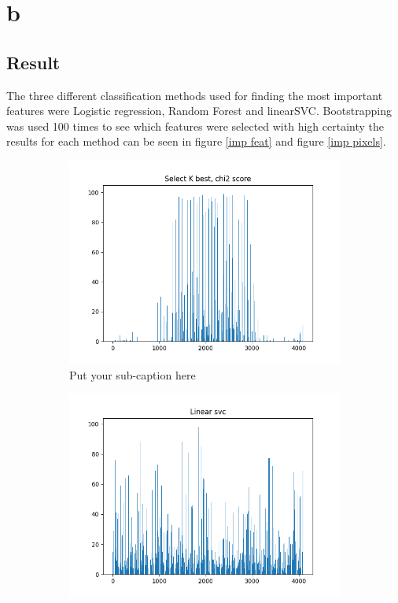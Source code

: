 \documentclass{article}
\begin{document}
\section{b}
\subsection{Result}
The three different classification methods used for finding the most important features were Logistic regression, Random Forest and linearSVC. Bootstrapping was used 100 times to see which features were selected with high certainty the results for each method can be seen in figure \ref{imp feat} and figure \ref{imp pixels}. 
\begin{figure}[ht]
\begin{subfigure}{.33\textwidth}
  \centering
  \includegraphics[width=1\linewidth]{1b/Figure_2.png}  
  \caption{Put your sub-caption here}
  \label{fig:sub-first}
\end{subfigure}
\begin{subfigure}{.33\textwidth}
  \centering
  \includegraphics[width=1\linewidth]{1b/Figure_3.png}  

\end{subfigure}
\end{figure}
\end{document}
